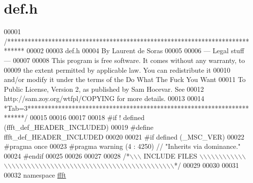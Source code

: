 \hypertarget{a00089_source}{\section{def.\+h}
\label{a00089_source}
}

\begin{DoxyCode}
00001 \textcolor{comment}{/*****************************************************************************}
00002 \textcolor{comment}{}
00003 \textcolor{comment}{        def.h}
00004 \textcolor{comment}{        By Laurent de Soras}
00005 \textcolor{comment}{}
00006 \textcolor{comment}{--- Legal stuff ---}
00007 \textcolor{comment}{}
00008 \textcolor{comment}{This program is free software. It comes without any warranty, to}
00009 \textcolor{comment}{the extent permitted by applicable law. You can redistribute it}
00010 \textcolor{comment}{and/or modify it under the terms of the Do What The Fuck You Want}
00011 \textcolor{comment}{To Public License, Version 2, as published by Sam Hocevar. See}
00012 \textcolor{comment}{http://sam.zoy.org/wtfpl/COPYING for more details.}
00013 \textcolor{comment}{}
00014 \textcolor{comment}{*Tab=3***********************************************************************/}
00015 
00016 
00017 
00018 \textcolor{preprocessor}{#if ! defined (ffft\_def\_HEADER\_INCLUDED)}
00019 \textcolor{preprocessor}{#define ffft\_def\_HEADER\_INCLUDED}
00020 
00021 \textcolor{preprocessor}{#if defined (\_MSC\_VER)}
00022 \textcolor{preprocessor}{    #pragma once}
00023 \textcolor{preprocessor}{    #pragma warning (4 : 4250) // "Inherits via dominance."}
00024 \textcolor{preprocessor}{#endif}
00025 
00026 
00027 
00028 \textcolor{comment}{/*\(\backslash\)\(\backslash\)\(\backslash\) INCLUDE FILES \(\backslash\)\(\backslash\)\(\backslash\)\(\backslash\)\(\backslash\)\(\backslash\)\(\backslash\)\(\backslash\)\(\backslash\)\(\backslash\)\(\backslash\)\(\backslash\)\(\backslash\)\(\backslash\)\(\backslash\)\(\backslash\)\(\backslash\)\(\backslash\)\(\backslash\)\(\backslash\)\(\backslash\)\(\backslash\)\(\backslash\)\(\backslash\)\(\backslash\)\(\backslash\)\(\backslash\)\(\backslash\)\(\backslash\)\(\backslash\)\(\backslash\)\(\backslash\)\(\backslash\)\(\backslash\)\(\backslash\)\(\backslash\)\(\backslash\)\(\backslash\)\(\backslash\)\(\backslash\)\(\backslash\)\(\backslash\)\(\backslash\)\(\backslash\)\(\backslash\)\(\backslash\)\(\backslash\)\(\backslash\)\(\backslash\)\(\backslash\)\(\backslash\)\(\backslash\)\(\backslash\)\(\backslash\)\(\backslash\)\(\backslash\)*/}
00029 
00030 
00031 
00032 \textcolor{keyword}{namespace }\hyperlink{a00142}{ffft}

\end{DoxyCode}
